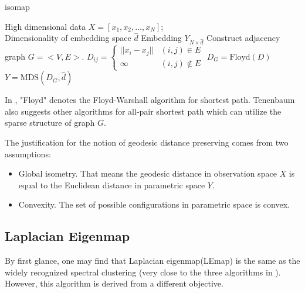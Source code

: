 \begin{algorithm}[htb]
	\caption{isomap}
	\label{alg:isomap}
	\begin{algorithmic}[1]
		\REQUIRE High dimensional data $X = [x_1, x_2, \ldots, x_N]$; \\
			Dimensionality of embedding space $ \hat{d} $
		\ENSURE Embedding $ Y_{N \times \hat{d}} $
		\STATE Construct adjacency graph $ G = <V, E> $. 
		\STATE $ D_{ij} = \left\lbrace \begin{array}{cc}
			||x_i - x_j|| & (i,j) \in E \\
			\infty & (i,j) \notin E
		\end{array} \right. $
		\STATE $ D_G = \text{Floyd}({D}) $
		\STATE $ Y = \text{MDS}(D_G, \hat{d}) $
	\end{algorithmic}
\end{algorithm}

In \ralg{\ref{alg:isomap}}, "Floyd" denotes the Floyd-Warshall algorithm \cite{wiki_floyd}
for shortest path. Tenenbaum also suggests other algorithms 
for all-pair shortest path which can utilize the sparse 
structure of graph $ G $\cite{tenenbaum2000isomap}. 

The justification for the notion of geodesic distance preserving 
comes from two assumptions:\cite{donoho2003hessian}
\begin{itemize}
	\item Global isometry. That means the geodesic distance 
	in observation space $ X $ is equal to the Euclidean distance 
	in parametric space $ Y $. 
	\item Convexity. The set of possible configurations 
	in parametric space is convex.  
\end{itemize}


\subsection{Laplacian Eigenmap}
\label{sec:lemap}

By first glance, one may find that 
Laplacian eigenmap(LEmap)\cite{belkin2003laplacian}
is the same as the widely recognized
spectral clustering (very close to the three
algorithms in \cite{von2007tutorial}). 
However, this algorithm is derived from a 
different objective. 

